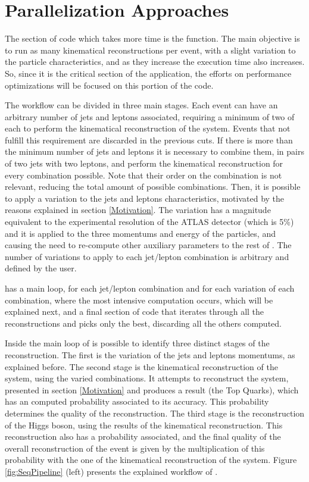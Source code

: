 \chapter{Parallelization Approaches}
\label{Parallelization:Sequential}

The section of code which takes more time is the \ttDilepKinFit function. The main objective is to run as many kinematical reconstructions per event, with a slight variation to the particle characteristics, and as they increase the \ttDilepKinFit execution time also increases. So, since it is the critical section of the application, the efforts on performance optimizations will be focused on this portion of the code.

The \ttDilepKinFit workflow can be divided in three main stages. Each event can have an arbitrary number of jets and leptons associated, requiring a minimum of two of each to perform the kinematical reconstruction of the \ttbar system. Events that not fulfill this requirement are discarded in the previous cuts. If there is more than the minimum number of jets and leptons it is necessary to combine them, in pairs of two jets with two leptons, and perform the kinematical reconstruction for every combination possible. Note that their order on the combination is not relevant, reducing the total amount of possible combinations. Then, it is possible to apply a variation to the jets and leptons characteristics, motivated by the reasons explained in section \ref{Motivation}. The variation has a magnitude equivalent to the experimental resolution of the ATLAS detector (which is 5\%) and it is applied to the three momentums and energy of the particles, and causing the need to re-compute other auxiliary parameters to the rest of \ttDilepKinFit. The number of variations to apply to each jet/lepton combination is arbitrary and defined by the user.

\ttDilepKinFit has a main loop, for each jet/lepton combination and for each variation of each combination, where the most intensive computation occurs, which will be explained next, and a final section of code that iterates through all the reconstructions and picks only the best, discarding all the others computed.

Inside the main loop of \ttDilepKinFit is possible to identify three distinct stages of the reconstruction. The first is the variation of the jets and leptons momentums, as explained before. The second stage is the kinematical reconstruction of the \ttbar system, using the varied combinations. It attempts to reconstruct the \ttbar system, presented in section \ref{Motivation} and produces a result (the Top Quarks), which has an computed probability associated to its accuracy. This probability determines the quality of the reconstruction. The third stage is the reconstruction of the Higgs boson, using the results of the kinematical reconstruction. This reconstruction also has a probability associated, and the final quality of the overall reconstruction of the event is given by the multiplication of this probability with the one of the kinematical reconstruction of the \ttbar system. Figure \ref{fig:SeqPipeline} (left) presents the explained workflow of \ttDilepKinFit.


